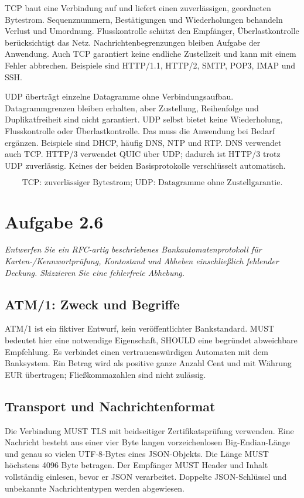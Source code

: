 \documentclass[a4paper,11pt]{article}
\newif\ifexplain
\newcommand{\aufgabe}[1]{\section*{Aufgabe #1}}
\newcommand{\angabe}[1]{{\raggedright\textit{#1}\par}\smallskip}
\newcommand{\explain}[1]{\ifexplain\begin{erklbox}#1\end{erklbox}\fi}
\begin{document}
TCP baut eine Verbindung auf und liefert einen zuverlässigen, geordneten Bytestrom. Sequenznummern, Bestätigungen und Wiederholungen behandeln Verlust und Umordnung. Flusskontrolle schützt den Empfänger, Überlastkontrolle berücksichtigt das Netz. Nachrichtenbegrenzungen bleiben Aufgabe der Anwendung. Auch TCP garantiert keine endliche Zustellzeit und kann mit einem Fehler abbrechen. Beispiele sind HTTP/1.1, HTTP/2, SMTP, POP3, IMAP und SSH.

UDP überträgt einzelne Datagramme ohne Verbindungsaufbau. Datagrammgrenzen bleiben erhalten, aber Zustellung, Reihenfolge und Duplikatfreiheit sind nicht garantiert. UDP selbst bietet keine Wiederholung, Flusskontrolle oder Überlastkontrolle. Das muss die Anwendung bei Bedarf ergänzen. Beispiele sind DHCP, häufig DNS, NTP und RTP. DNS verwendet auch TCP. HTTP/3 verwendet QUIC über UDP; dadurch ist HTTP/3 trotz UDP zuverlässig. Keines der beiden Basisprotokolle verschlüsselt automatisch.
\explain{TCP ähnelt einem geordneten Datenstrom, nicht einer Liste abgeschlossener Nachrichten. Ein einzelnes send muss beim Empfänger nicht einem recv entsprechen. Bei UDP ist die Nachrichtengrenze da, dafür kann ein ganzes Datagramm fehlen. Weniger Mechanismen bedeuten nicht in jedem Anwendungsfall automatisch weniger Verzögerung.}
\[\boxed{\text{TCP: zuverlässiger Bytestrom; UDP: Datagramme ohne Zustellgarantie.}}\]

\aufgabe{2.6}
\angabe{Entwerfen Sie ein RFC-artig beschriebenes Bankautomatenprotokoll für Karten-/Kennwortprüfung, Kontostand und Abheben einschließlich fehlender Deckung. Skizzieren Sie eine fehlerfreie Abhebung.}
\subsection*{ATM/1: Zweck und Begriffe}
ATM/1 ist ein fiktiver Entwurf, kein veröffentlichter Bankstandard. MUST bedeutet hier eine notwendige Eigenschaft, SHOULD eine begründet abweichbare Empfehlung. Es verbindet einen vertrauenswürdigen Automaten mit dem Banksystem. Ein Betrag wird als positive ganze Anzahl Cent und mit Währung EUR übertragen; Fließkommazahlen sind nicht zulässig.
\subsection*{Transport und Nachrichtenformat}
Die Verbindung MUST TLS mit beidseitiger Zertifikatsprüfung verwenden. Eine Nachricht besteht aus einer vier Byte langen vorzeichenlosen Big-Endian-Länge und genau so vielen UTF-8-Bytes eines JSON-Objekts. Die Länge MUST höchstens 4096 Byte betragen. Der Empfänger MUST Header und Inhalt vollständig einlesen, bevor er JSON verarbeitet. Doppelte JSON-Schlüssel und unbekannte Nachrichtentypen werden abgewiesen.
\end{document}
